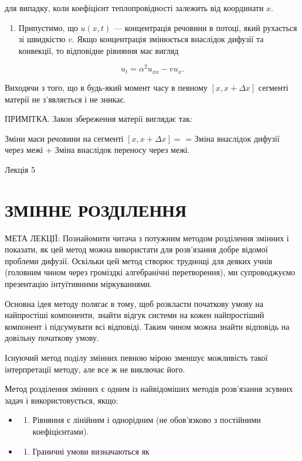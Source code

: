 \documentclass[
  ukrainian,
]{article}
\providecommand{\tightlist}{%
  \setlength{\itemsep}{0pt}\setlength{\parskip}{0pt}}
\begin{document}
для випадку, коли коефіцієнт теплопровідності залежить від координати
\(x\).

\begin{enumerate}
\def\labelenumi{\arabic{enumi}.}
\setcounter{enumi}{3}
\tightlist
\item
  Припустимо, що \(u(x,t)\) --- концентрація речовини в потоці, який
  рухається зі швидкістю \(v\). Якщо концентрація змінюється внаслідок
  дифузії та конвекції, то відповідне рівняння має вигляд
\end{enumerate}

\[
u_t = \alpha^2 u_{xx} - v u_x.
\]

Виходячи з того, що в будь-який момент часу в певному
\([x, x + \Delta x]\) сегменті матерії не з'являється і не зникає.

ПРИМІТКА. Закон збереження матерії виглядає так:

Зміни маси речовини на сегменті \([x, x + \Delta x] =\) = Зміна
внаслідок дифузії через межі + Зміна внаслідок переносу через межі.

Лекція 5

\section{ЗМІННЕ
РОЗДІЛЕННЯ}\label{ux437ux43cux456ux43dux43dux435-ux440ux43eux437ux434ux456ux43bux435ux43dux43dux44f}

МЕТА ЛЕКЦІЇ: Познайомити читача з потужним методом розділення змінних і
показати, як цей метод можна використати для розв'язання добре відомої
проблеми дифузії. Оскільки цей метод створює труднощі для деяких учнів
(головним чином через громіздкі алгебранічні перетворення), ми
супроводжуємо презентацію інтуїтивними міркуваннями.

Основна ідея методу полягає в тому, щоб розкласти початкову умову на
найпростіші компоненти, знайти відгук системи на кожен найпростіший
компонент і підсумувати всі відповіді. Таким чином можна знайти
відповідь на довільну початкову умову.

Існуючий метод поділу змінних певною мірою зменшує можливість такої
інтерпретації методу, але все ж не виключає його.

Метод розділення змінних є одним із найвідоміших методів розв'язання
зсувних задач і використовується, якщо:

\begin{itemize}
\tightlist
\item
  \begin{enumerate}
  \def\labelenumi{\arabic{enumi}.}
  \tightlist
  \item
    Рівняння є лінійним і однорідним (не обов'язково з постійними
    коефіцієнтами).
  \end{enumerate}
\item
  \begin{enumerate}
  \def\labelenumi{\arabic{enumi}.}
  \setcounter{enumi}{1}
  \tightlist
  \item
    Граничні умови визначаються як
  \end{enumerate}
\end{itemize}
\end{document}
